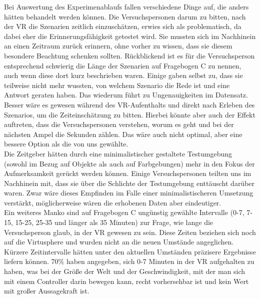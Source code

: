 \documentclass{Bericht}
\begin{document}
Bei Auswertung des Experimenablaufs fallen verschiedene Dinge auf, die anders hätten behandelt werden können.
Die Versuchspersonen darum zu bitten, nach der VR die Szenarien zeitlich einzuschätzen, erwies sich als problematisch, da dabei eher die Erinnerungsfähigkeit getestet wird. Sie mussten sich im Nachhinein an einen Zeitraum zurück erinnern, ohne vorher zu wissen, dass sie diesem besondere Beachtung schenken sollten. 
Rückblickend ist es für die Versuchsperson entsprechend schwierig die Länge der Szenarien auf Fragebogen C zu nennen, auch wenn diese dort kurz beschrieben waren. 
Einige gaben selbst zu, dass sie teilweise nicht mehr wussten, von welchem Szenario die Rede ist und eine Antwort geraten haben. Das wiederum führt zu Ungenauigkeiten im Datensatz. \\
 Besser wäre es gewesen während des VR-Aufenthalts und direkt nach Erleben des Szenarios, um die Zeiteinschätzung zu bitten. Hierbei könnte aber auch der Effekt auftreten, dass die Versuchspersonen verstehen, worum es geht und bei der nächsten Ampel die Sekunden zählen. Das wäre auch nicht optimal, aber eine bessere Option als die von uns gewählte.\\
Die Zeitgeber hätten durch eine minimalistischer gestaltete Testumgebung (sowohl im Bezug auf Objekte als auch auf Farbgebungen) mehr in den Fokus der Aufmerksamkeit gerückt werden können. 
Einige Versuchspersonen teilten uns im Nachhinein mit, dass sie über die Schlichte der Testumgebung enttäuscht darüber waren. Zwar wäre dieses Empfinden im Falle einer minimalistischeren Umsetzung verstärkt, möglicherweise wären die erhobenen Daten aber eindeutiger.\\
Ein weiteres Manko sind auf Fragebogen C ungünstig gewählte Intervalle (0-7, 7-15, 15-25, 25-35 und länger als 35 Minuten) zur Frage, wie lange die Versuchsperson glaub, in der VR gewesen zu sein. Diese Zeiten beziehen sich noch auf die Virtusphere und wurden nicht an die neuen Umstände angeglichen. 
Kürzere Zeitintervalle hätten unter den aktuellen Umständen präzisere Ergebnisse liefern können. 70\% haben angegeben, sich 0-7 Minuten in der VR aufgehalten zu haben, was bei der Größe der Welt und der Geschwindigkeit, mit der man sich mit einem Controller darin bewegen kann, recht vorhersehbar ist und kein Wert mit großer Aussagekraft ist.
\end{document}

